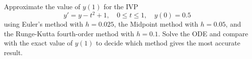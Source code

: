\documentclass[worksheet]{workbook}
\begin{document}
	
	\maketitle
    
\begin{exercise}
    Approximate the value of $y(1)$ for the IVP 
    \[y'=y-t^2+1, \quad 0\leq t\leq 1, \quad y(0)=0.5\]
    using  Euler’s method with $h = 0.025$, the Midpoint method with $h = 0.05$, and the Runge-Kutta fourth-order method with $h = 0.1$.  Solve the ODE and compare with the exact value of $y(1)$ to decide which method gives the most accurate result.
\end{exercise}
	
\end{document}
